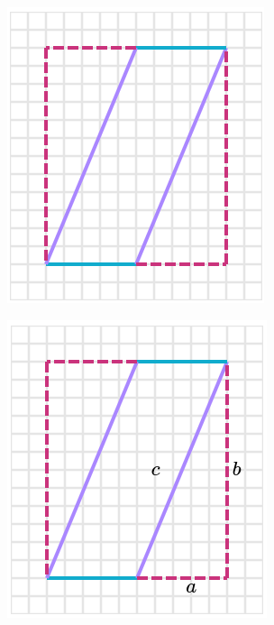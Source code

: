 \begin{solutionbox}{16cm}
    \begin{minipage}{0.4\textwidth}
        \begin{multicols}{2}
            \begin{figure}[H]
                \centering
                \includegraphics[width=0.9\linewidth]{../images/peri_paralelogramo_03a.png}
                \caption{}
                \label{fig:peri_paralelogramo_03a}
            \end{figure}
            \begin{figure}[H]
                \centering
                \includegraphics[width=0.9\linewidth]{../images/peri_paralelogramo_03b.png}

\end{figure}
\end{multicols}
\end{minipage}
\end{solutionbox}
